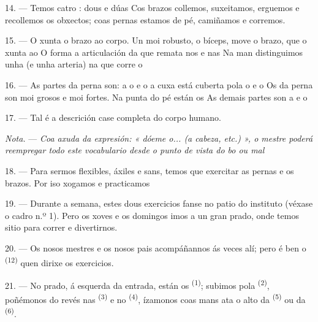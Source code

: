 \VUsaut{4.4mm}
\VUsaut{3.0mm}

14. --- Temos catro : dous  e dúas  Cos brazos
collemos, suxeitamos, erguemos e recollemos os obxectos; coas pernas estamos de pé, camiñamos
e corremos.

15. --- O  xunta o brazo ao corpo. Un  moi robusto, o bíceps,
move o brazo, que o  xunta ao  O
 forma a articulación da  que remata nos  e
nas  Na man distinguimos unha  (e unha arteria) na que corre o

16. --- As partes da perna son: a  o  e o
 a  cuxa  está cuberta pola
 o  e o  Os  da perna son moi
grosos e moi fortes. Na punta do pé están os  As demais partes son a
 e o 

17. --- Tal é a descrición case completa do corpo humano.

\textit{Nota.} --- \textit{Coa axuda da expresión: « dóeme o... (a cabeza, etc.) », o mestre
poderá reempregar todo este vocabulario desde o punto de vista do bo ou mal}

\VUsaut{5.0mm}
\VUsaut{2.4mm}
\VUsaut{3.0mm}

18. --- Para sermos flexibles, áxiles e sans, temos que exercitar as pernas e os brazos. Por
iso xogamos e practicamos 

19. --- Durante a semana, estes dous exercicios fanse no patio do instituto (véxase o cadro
n.º 1). Pero os xoves e os domingos imos a un gran prado, onde temos sitio para correr e
divertirnos.

20. --- Os nosos mestres e os nosos pais acompáñannos ás veces alí; pero é ben o
 \textsuperscript{(12)} quen dirixe os exercicios.

21. --- No prado, á esquerda da entrada, están os 
\textsuperscript{(1)}; subimos pola  \textsuperscript{(2)}, poñémonos do revés
nas  \textsuperscript{(3)} e no  \textsuperscript{(4)},
ízamonos coas mans ata o alto da  \textsuperscript{(5)} ou da
 \textsuperscript{(6)}.


